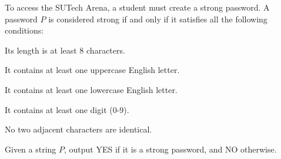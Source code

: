 To access the SUTech Arena, a student must create a strong password. A password $P$ is considered strong if and only if it satisfies all the following conditions:

Its length is at least 8 characters.

It contains at least one uppercase English letter.

It contains at least one lowercase English letter.

It contains at least one digit (0-9).

No two adjacent characters are identical.

Given a string $P$, output YES if it is a strong password, and NO otherwise.